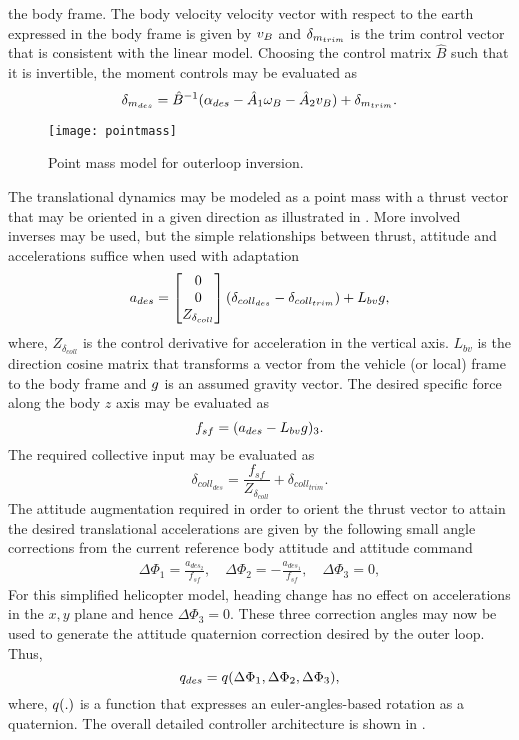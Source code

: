 the body frame. The body velocity velocity vector with respect to the
earth expressed in the body frame is given by $v_B$ and
$\delta_{m_{trim}}$ is the trim control vector that is consistent
with the linear model.
%
Choosing the control matrix $\hat{B}$ such that it is invertible,
the moment controls may be evaluated as
%
\[
\delta_{m_{des}} = \hat{B}^{-1}(\alpha_{des} - \hat{A}_1\omega_B - \hat{A}_2
v_B) + \delta_{m_{trim}}.
\]
%
\begin{figure}
  \centering\texttt{[image: pointmass]}
  \caption{Point mass model for outerloop inversion.}
  \label{f:pointmass}
\end{figure}
%
The translational dynamics may be modeled as a point mass with a
thrust vector that may be oriented in a given direction as
illustrated in . More involved inverses
\cite{lipp:mcm:1993} may be used, but the simple relationships between
thrust, attitude and accelerations suffice when used with adaptation
%
\begin{equation}
\label{e:transinverse} a_{des} =
\begin{bmatrix}
0 \\ 0 \\ Z_{\delta_{coll}}
\end{bmatrix}
\left(
\delta_{coll_{des}} - \delta_{coll_{trim}}
\right)
 + L_{bv}g,
\end{equation}
where, $Z_{\delta_{coll}}$ is the control derivative for
acceleration in the vertical axis. $L_{bv}$ is the direction cosine
matrix that transforms a vector from the vehicle (or local) frame to
the body frame and $g$ is an assumed gravity vector. The desired
specific force along the body $z$ axis may be evaluated as
\[
f_{sf} = (a_{des} - L_{bv}g)_3.
\]
%
The required collective input may be evaluated as
\[
\delta_{coll_{des}} = \frac{f_{sf}}{Z_{\delta_{coll}}} +
\delta_{coll_{trim}}.
\]
%
The attitude augmentation required in order to orient the thrust
vector to attain the desired translational accelerations are given
by the following small angle corrections from the current
reference body attitude and attitude command
%
\begin{align}
\label{e:DelPhi}
\Delta\Phi_1  = \frac{a_{des_2}}{f_{sf}},\quad%
\Delta\Phi_2  = -\frac{a_{des_1}}{f_{sf}},\quad%
\Delta\Phi_3  = 0,%
\end{align}
For this simplified helicopter model, heading change has no effect
on accelerations in the $x,y$ plane and hence $\Delta\Phi_3 = 0$.
These three correction angles may now be used to generate the
attitude quaternion correction desired by the outer loop. Thus,
%
\begin{equation}
\label{e:qdessmallangle} q_{des} =
q(\Delta\Phi_1,\Delta\Phi_2,\Delta\Phi_3),
\end{equation}
where, $q(.)$ is a function\cite{stevens2003} that expresses an
euler-angles-based rotation as a quaternion. The overall detailed
controller architecture is shown in .
%

